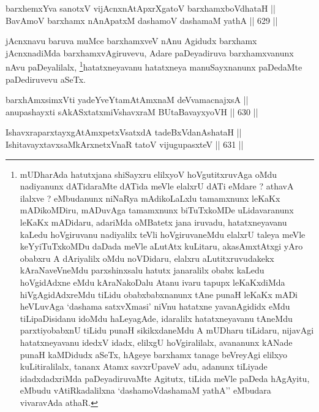 
\begin{shl}
barxhemxYva sanotxV vijAcnxnAtApxrXgatoV barxhamxboVdhataH || \\
BavAmoV barxhamx nAnApatxM dashamoV dashamaM yathA ||  629 ||  
\end{shl}

\begin{artha}
jAcnxnavu baruva muMce barxhamxveV nAnu Agidudx barxhamx jAcnxnadiMda
barxhamxvAgiruvevu, Adare paDeyadiruva barxhamxvanunx nAvu
paDeyalilalx, \footnote{mUDharAda hatutxjana shiSayxru elilxyoV
  hoVgutitxruvAga oMdu nadiyanunx dATidaraMte dATida meVle elalxrU
  dATi eMdare ? athavA ilalxve ? eMbudanunx niNaRya mAdikoLaLxlu
  tamamxnunx leKaKx mADikoMDiru, mADuvAga tamamxnunx biTuTxkoMDe
  uLidavaranunx leKaKx mADidaru, adariMda oMBatetx jana iruvadu,
  hatatxneyavanu kaLedu hoVgiruvanu nadiyalilx teVli hoVgiruvaneMdu
  elalxrU taleya meVle keYyiTuTxkoMDu daDada meVle aLutAtx kuLitaru,
  akasAmxtAtxgi yAro obabxru A dAriyalilx oMdu noVDidaru, elalxru
  aLutitxruvudakekx kAraNaveVneMdu parxshinxsalu hatutx janaralilx
  obabx kaLedu hoVgidAdxne eMdu kAraNakoDalu Atanu ivaru tapupx
  leKaKxdiMda hiVgAgidAdxreMdu tiLidu obabxbabxnanunx tAne punaH
  leKaKx mADi heVLuvAga `dashama satxvXmasi' niVnu hatatxne
  yavanAgididx eMdu tiLipaDisidanu idoMdu haLeyagAde, idaralilx
  hatatxneyavanu tAneMdu parxtiyobabxnU tiLidu punaH sikikxdaneMdu A
  mUDharu tiLidaru, nijavAgi hatatxneyavanu idedxV idadx, elilxgU
  hoVgiralilalx, avananunx kANade punaH kaMDidudx aSeTx, hAgeye
  barxhamx tanage beVreyAgi elilxyo kuLitiralilalx, tananx Atamx
  savxrUpaveV adu, adanunx tiLiyade idadxdadxriMda paDeyadiruvaMte
  Agitutx, tiLida meVle paDeda hAgAyitu, eMbudu vAtiRkadalilxna
  `dashamoVdashamaM yathA'' eMbudara vivaravAda athaR.}hatatxneyavanu hatatxneya manuSayxnanunx
paDedaMte paDediruvevu aSeTx.
\end{artha}

\begin{shl}
barxhAmxsimxVti yadeYveYtamAtAmxnaM deVvamacnajxsA || \\
anupashayxti sAkASxtatxmiVshavxraM BUtaBavayxyoVH ||  630 ||  
\end{shl}
				
\begin{shl}
IshavxraparxtayxgAtAmxpetxVsatxdA tadeBxVdanAshataH || \\
IshitavayxtavxsaMkArxnetxVnaR tatoV vijugupasxteV ||  631 ||  
\end{shl}

